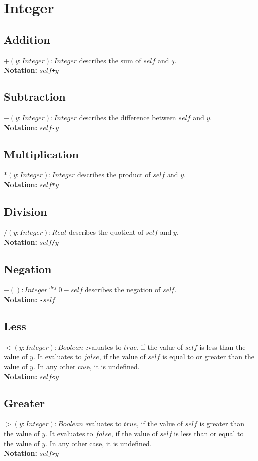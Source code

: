 \section{Integer}
\subsection{Addition} $+(y:\mathit{Integer}):\mathit{Integer}$ describes the sum of
$\mathit{self}$ and
$y$.\\
  {\bf Notation:} $\mathit{self}$\verb-+-$y$
\subsection{Subtraction}
$-(y:\mathit{Integer}):\mathit{Integer}$ describes the difference
between $\mathit{self}$ and $y$.\\
  {\bf Notation:} $\mathit{self}$\verb+-+$y$
\subsection{Multiplication}
$*(y:\mathit{Integer}):\mathit{Integer}$ describes the product of $\mathit{self}$
and
  $y$.\\
  {\bf Notation:} $\mathit{self}$\verb+*+$y$
\subsection{Division}
$/(y:\mathit{Integer}):\mathit{Real}$ describes the quotient of $\mathit{self}$
and
  $y$.\\
  {\bf Notation:} $\mathit{self}$\verb+/+$y$
\subsection{Negation}
$-():\mathit{Integer}\stackrel{def}{=} 0-\mathit{self}$ describes the negation of
  $\mathit{self}$.\\
  {\bf Notation:} \verb+-+$\mathit{self}$
\subsection{Less}
$<(y:\mathit{Integer}):\mathit{Boolean}$ evaluates to $\mathit{true}$, if the
value of
  $\mathit{self}$ is less than the value of $y$.  It evaluates to $\mathit{false}$, if
  the value of $\mathit{self}$ is equal to or greater than the value of $y$.
  In any other case, it is undefined.\\
  {\bf Notation:} $\mathit{self}$\verb+<+$y$
\subsection{Greater}
$>(y:\mathit{Integer}):\mathit{Boolean}$ evaluates to $\mathit{true}$, if the
value of
  $\mathit{self}$ is greater than the value of $y$.  It evaluates to $\mathit{false}$,
  if the value of $\mathit{self}$ is less than or equal to the value of $y$.
  In any other case, it is undefined.\\
  {\bf Notation:} $\mathit{self}$\verb+>+$y$
